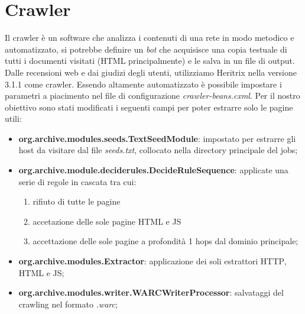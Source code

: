 \documentclass[a4paper, 11pt, oneside]{report}
\begin{document}
\section{Crawler}
Il crawler è un software che analizza i contenuti di una rete in modo metodico e automatizzato, si potrebbe definire un \textit{bot} che acquisisce una copia testuale di tutti i documenti visitati (HTML principalmente) e le salva in un file di output. Dalle recensioni web e dai giudizi degli utenti, utilizziamo Heritrix \cite{heritrix} nella versione 3.1.1 come crawler. Essendo altamente automatizzato è possibile impostare i parametri a piacimento nel file di configurazione \textit{crawler-beans.cxml}. Per il nostro obiettivo sono stati modificati i seguenti campi per poter estrarre solo le pagine utili:
\begin{itemize}
\item \textbf{org.archive.modules.seeds.TextSeedModule}: impostato per estrarre gli host da visitare dal file \textit{seeds.txt}, collocato nella directory principale del \textsf{jobs};
\item \textbf{org.archive.module.deciderules.DecideRuleSequence}: applicate una serie di regole in cascata tra cui: 
\begin{enumerate}
\item rifiuto di tutte le pagine
\item accetazione delle sole pagine \textsc{HTML} e \textsc{JS}
\item accettazione delle sole pagine a profondità 1 \textsf{hops} dal dominio principale;
\end{enumerate}
\item \textbf{org.archive.modules.Extractor}: applicazione dei soli estrattori \textsc{HTTP}, \textsc{HTML} e \textsc{JS};
\item \textbf{org.archive.modules.writer.WARCWriterProcessor}: salvataggi del crawling nel formato \textit{.warc};
\end{itemize}
\end{document}
